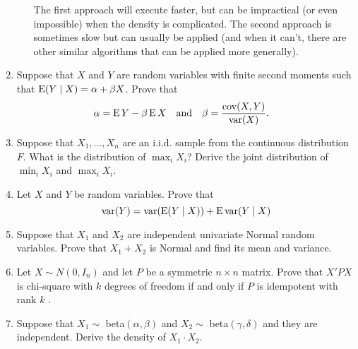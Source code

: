\begin{enumerate}
\begin{enumerate}
    The first approach will execute faster, but can be impractical (or
    even impossible) when the density is complicated. The second
    approach is sometimes slow but can usually be applied (and when it
    can't, there are other similar algorithms that can be applied more
    generally).
  \end{enumerate}

\item Suppose that $X$ and $Y$ are random variables with finite second
  moments such that $\operatorname{E}(Y \mid X) = \alpha + \beta X$.  Prove that
  \begin{align}
    \alpha &= \operatorname{E} Y - \beta \operatorname{E} X &\text{and}&& \beta &= \frac{\operatorname{cov}(X, Y)}{\operatorname{var}(X)}.
  \end{align}

\item Suppose that $X_1,\dots,X_n$ are an i.i.d. sample from the continuous
  distribution $F$.  What is the distribution of $\max_i X_i$?  Derive
  the joint distribution of $\min_i X_i$ and $\max_i X_i$.

\item Let $X$ and $Y$ be random variables.  Prove that 
  \begin{equation}
    \operatorname{var}(Y) = \operatorname{var}(\operatorname{E}(Y \mid X)) + \operatorname{E} \operatorname{var}(Y \mid X)
  \end{equation}

\item Suppose that $X_1$ and $X_2$ are independent univariate Normal
  random variables.  Prove that $X_1 + X_2$ is Normal and find its mean
  and variance.

\item Let $X \sim N(0,I_n)$ and let $P$ be a symmetric $n \times n$ matrix.
  Prove that $X'PX$ is chi-square with $k$ degrees of freedom if and
  only if $P$ is idempotent with rank $k$ \citep{SL03}.

\item Suppose that $X_1 \sim$ beta$(\alpha, \beta)$ and $X_2 \sim$ beta$(\gamma, \delta)$ and
  they are independent.  Derive the density of $X_1 \cdot X_2$.

\end{enumerate}

